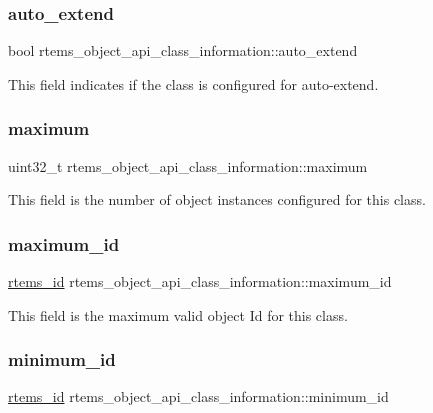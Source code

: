 \subsubsection{\texorpdfstring{auto\_extend}{auto\_extend}}
{\footnotesize\ttfamily bool rtems\+\_\+object\+\_\+api\+\_\+class\+\_\+information\+::auto\+\_\+extend}

This field indicates if the class is configured for auto-\/extend. \mbox{\label{structrtems__object__api__class__information_a8276d1cadf456cacaf496af9a0e616be}} 
\subsubsection{\texorpdfstring{maximum}{maximum}}
{\footnotesize\ttfamily uint32\+\_\+t rtems\+\_\+object\+\_\+api\+\_\+class\+\_\+information\+::maximum}

This field is the number of object instances configured for this class. \mbox{\label{structrtems__object__api__class__information_a0de5ee283c5e39ec8761e0729dd1f7f0}} 
\subsubsection{\texorpdfstring{maximum\_id}{maximum\_id}}
{\footnotesize\ttfamily \mbox{\hyperlink{group__ClassicTasks_gab20892b814dced7dd4e5b9bf42becd57}{rtems\+\_\+id}} rtems\+\_\+object\+\_\+api\+\_\+class\+\_\+information\+::maximum\+\_\+id}

This field is the maximum valid object Id for this class. \mbox{\label{structrtems__object__api__class__information_a8c69f070e857c76475f7b40fd1657552}} 
\subsubsection{\texorpdfstring{minimum\_id}{minimum\_id}}
{\footnotesize\ttfamily \mbox{\hyperlink{group__ClassicTasks_gab20892b814dced7dd4e5b9bf42becd57}{rtems\+\_\+id}} rtems\+\_\+object\+\_\+api\+\_\+class\+\_\+information\+::minimum\+\_\+id}

